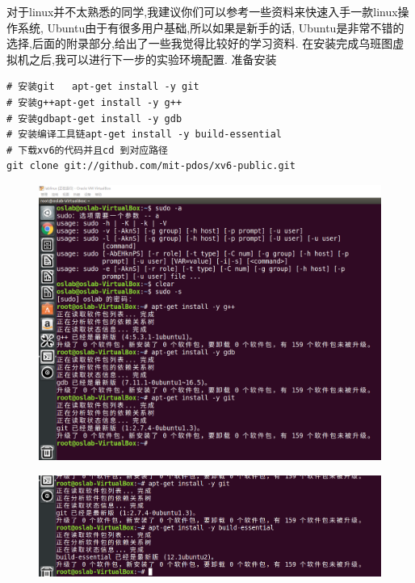 \documentclass[a4paper,12pt]{report}
\begin{document}
\begin{spacing}{1.5}


对于linux并不太熟悉的同学,我建议你们可以参考一些资料来快速入手一款linux操作系统, Ubuntu由于有很多用户基础,所以如果是新手的话, Ubuntu是非常不错的选择,后面的附录部分,给出了一些我觉得比较好的学习资料.
在安装完成乌班图虚拟机之后,我可以进行下一步的实验环境配置.
准备安装
\begin{lstlisting}
# 安装git   apt-get install -y git
# 安装g++apt-get install -y g++
# 安装gdbapt-get install -y gdb
# 安装编译工具链apt-get install -y build-essential
# 下载xv6的代码并且cd 到对应路径
git clone git://github.com/mit-pdos/xv6-public.git
\end{lstlisting}

\begin{figure}[H]
	\centering
	\includegraphics [width=1.0\textwidth]{figure//1.1.png}
\end{figure}


\begin{figure}[H]
	\centering
	\includegraphics [width=1.0\textwidth]{figure//1.2.png}
\end{figure}




\end{spacing}
\end{document}
